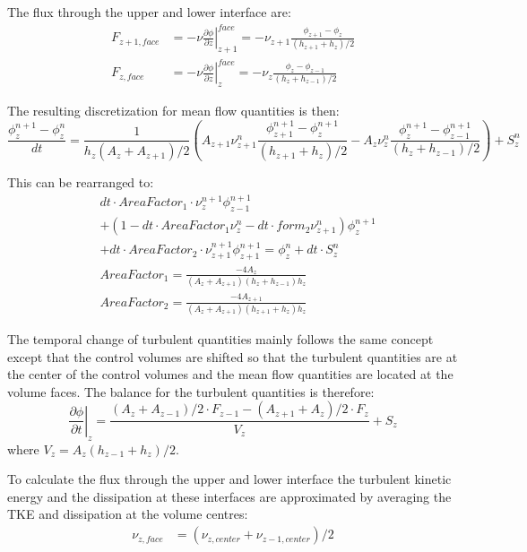 \documentclass[paper=a4, fontsize=12pt]{article}
\begin{document}
The flux through the upper and lower interface are:
\begin{align}
	F_{z+1,face} &= -\nu\left.\frac{\partial \phi}{\partial z}\right|_{z+1}^{face} = -\nu_{z+1}\frac{\phi_{z+1}-\phi_{z}}{(h_{z+1}+h_{z})/2} \\
	F_{z,face} &= -\nu\left.\frac{\partial \phi}{\partial z}\right|_{z}^{face} = -\nu_z\frac{\phi_{z}-\phi_{z-1}}{(h_{z}+h_{z-1})/2}
\end{align}

\noindent The resulting discretization for mean flow quantities is then:
\begin{equation}
	\frac{\phi^{n+1}_z-\phi^n_z}{dt} = \frac{1}{h_z\left(A_z+A_{z+1}\right)/2}
	\left(A_{z+1}\nu^{n}_{z+1}\frac{\phi^{n+1}_{z+1}-\phi^{n+1}_{z}}{(h_{z+1}+h_{z})/2}-A_{z}\nu^{n}_z\frac{\phi^{n+1}_{z}-\phi^{n+1}_{z-1}}{(h_{z}+h_{z-1})/2}
	\right)+S^n_z 
\end{equation}

\noindent This can be rearranged to:
\begin{align}
	&dt\cdot AreaFactor_1\cdot\nu^{n+1}_z\phi^{n+1}_{z-1}\nonumber\\
	&+(1-dt\cdot AreaFactor_1\nu^{n}_z-dt\cdot form_2\nu^{n}_{z+1})\phi^{n+1}_z\nonumber\\
	&+ dt\cdot AreaFactor_2\cdot\nu^{n+1}_{z+1}\phi^{n+1}_{z+1} = \phi^{n}_{z}+dt\cdot S^n_z\\
	&AreaFactor_1 = \frac{-4A_{z}}{\left(A_z+A_{z+1}\right)\left(h_{z}+h_{z-1}\right)h_{z}}\\
	&AreaFactor_2 = \frac{-4A_{z+1}}{\left(A_z+A_{z+1}\right)\left(h_{z+1}+h_{z}\right)h_{z}}
\end{align}

The temporal change of turbulent quantities mainly follows the same concept except that the control volumes are shifted so that the turbulent quantities are at the center of the control volumes and the mean flow quantities are located at the volume faces. The balance for the turbulent quantities is therefore:
\begin{equation}
	\left.\frac{\partial\phi}{\partial t}\right|_{z} =
	\frac{\left(A_z+A_{z-1}\right)/2\cdot F_{z-1}-\left(A_{z+1}+A_z\right)/2\cdot F_{z}}{V_z}+S_z
\end{equation}
where $V_z=A_z\left(h_{z-1}+h_{z}\right)/2$.

To calculate the flux through the upper and lower interface the turbulent kinetic energy and the dissipation at these interfaces are approximated by averaging the TKE and dissipation at the volume centres:
\begin{align}
	\nu_{z,face}&=\left(\nu_{z,center}+\nu_{z-1,center}\right)/2 \\
\end{align}
\end{document}
